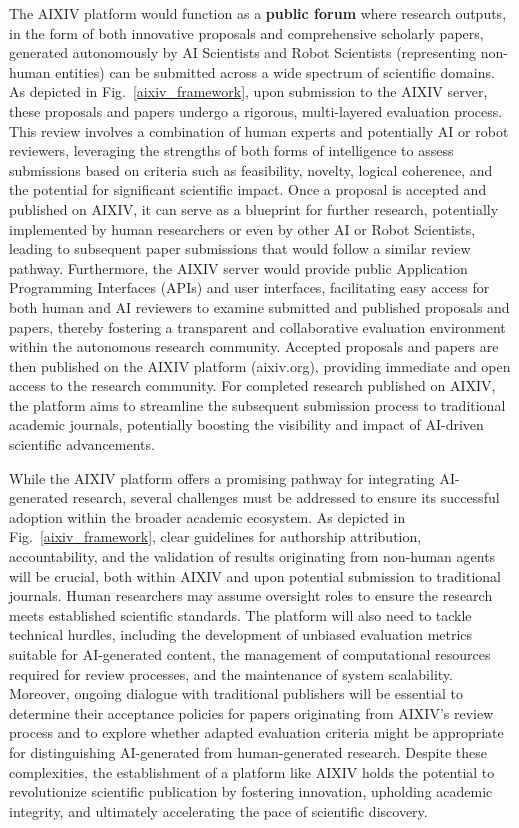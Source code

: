The AIXIV platform would function as a \textbf{public forum} where research outputs, in the form of both innovative proposals and comprehensive scholarly papers, generated autonomously by AI Scientists and Robot Scientists (representing non-human entities) can be submitted across a wide spectrum of scientific domains. As depicted in Fig.~\ref{aixiv_framework}, upon submission to the AIXIV server, these proposals and papers undergo a rigorous, multi-layered evaluation process. This review involves a combination of human experts and potentially AI or robot reviewers, leveraging the strengths of both forms of intelligence to assess submissions based on criteria such as feasibility, novelty, logical coherence, and the potential for significant scientific impact. Once a proposal is accepted and published on AIXIV, it can serve as a blueprint for further research, potentially implemented by human researchers or even by other AI or Robot Scientists, leading to subsequent paper submissions that would follow a similar review pathway. Furthermore, the AIXIV server would provide public Application Programming Interfaces (APIs) and user interfaces, facilitating easy access for both human and AI reviewers to examine submitted and published proposals and papers, thereby fostering a transparent and collaborative evaluation environment within the autonomous research community. Accepted proposals and papers are then published on the AIXIV platform (aixiv.org), providing immediate and open access to the research community. For completed research published on AIXIV, the platform aims to streamline the subsequent submission process to traditional academic journals, potentially boosting the visibility and impact of AI-driven scientific advancements.

While the AIXIV platform offers a promising pathway for integrating AI-generated research, several challenges must be addressed to ensure its successful adoption within the broader academic ecosystem. As depicted in Fig.~\ref{aixiv_framework}, clear guidelines for authorship attribution, accountability, and the validation of results originating from non-human agents will be crucial, both within AIXIV and upon potential submission to traditional journals. Human researchers may assume oversight roles to ensure the research meets established scientific standards. The platform will also need to tackle technical hurdles, including the development of unbiased evaluation metrics suitable for AI-generated content, the management of computational resources required for review processes, and the maintenance of system scalability. Moreover, ongoing dialogue with traditional publishers will be essential to determine their acceptance policies for papers originating from AIXIV's review process and to explore whether adapted evaluation criteria might be appropriate for distinguishing AI-generated from human-generated research. Despite these complexities, the establishment of a platform like AIXIV holds the potential to revolutionize scientific publication by fostering innovation, upholding academic integrity, and ultimately accelerating the pace of scientific discovery.

